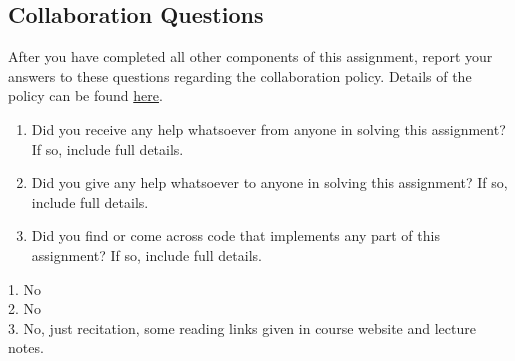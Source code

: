 \documentclass[11pt,addpoints,answers]{exam}
\begin{document}
\begin{questions}
\section{Collaboration Questions}
After you have completed all other components of this assignment, report your answers to these questions regarding the collaboration policy. Details of the policy can be found \href{http://www.cs.cmu.edu/~mgormley/courses/10601/syllabus.html}{here}.
\begin{enumerate}
    \item Did you receive any help whatsoever from anyone in solving this assignment? If so, include full details.
    \item Did you give any help whatsoever to anyone in solving this assignment? If so, include full details.
    \item Did you find or come across code that implements any part of this assignment? If so, include full details.
\end{enumerate}

\begin{your_solution}[height=6cm]
1. No \\
2. No \\
3. No, just recitation, some reading links given in course website and lecture notes.

\end{your_solution}
    \newpage
    \end{questions}
\end{document}
